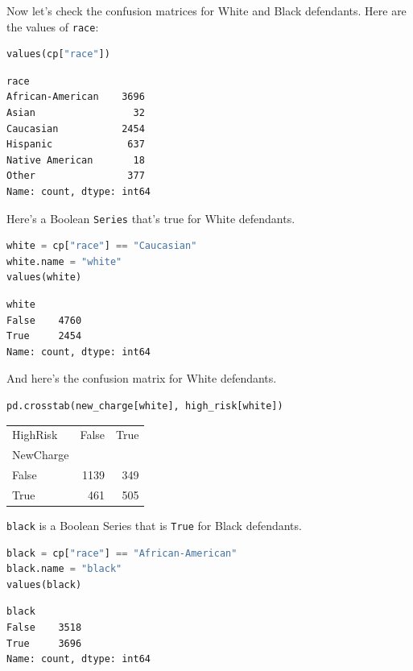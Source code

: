 Now let's check the confusion matrices for White and Black defendants.
Here are the values of \passthrough{\lstinline!race!}:

\begin{lstlisting}[language=Python,style=source]
values(cp["race"])
\end{lstlisting}

\begin{lstlisting}[style=output]
race
African-American    3696
Asian                 32
Caucasian           2454
Hispanic             637
Native American       18
Other                377
Name: count, dtype: int64
\end{lstlisting}

Here's a Boolean \passthrough{\lstinline!Series!} that's true for White
defendants.

\begin{lstlisting}[language=Python,style=source]
white = cp["race"] == "Caucasian"
white.name = "white"
values(white)
\end{lstlisting}

\begin{lstlisting}[style=output]
white
False    4760
True     2454
Name: count, dtype: int64
\end{lstlisting}

And here's the confusion matrix for White defendants.

\begin{lstlisting}[language=Python,style=source]
pd.crosstab(new_charge[white], high_risk[white])
\end{lstlisting}

\begin{tabular}{lrr}
\midrule
HighRisk & False & True \\
NewCharge &  &  \\
\midrule
False & 1139 & 349 \\
True & 461 & 505 \\
\midrule
\end{tabular}

\passthrough{\lstinline!black!} is a Boolean Series that is
\passthrough{\lstinline!True!} for Black defendants.

\begin{lstlisting}[language=Python,style=source]
black = cp["race"] == "African-American"
black.name = "black"
values(black)
\end{lstlisting}

\begin{lstlisting}[style=output]
black
False    3518
True     3696
Name: count, dtype: int64
\end{lstlisting}

